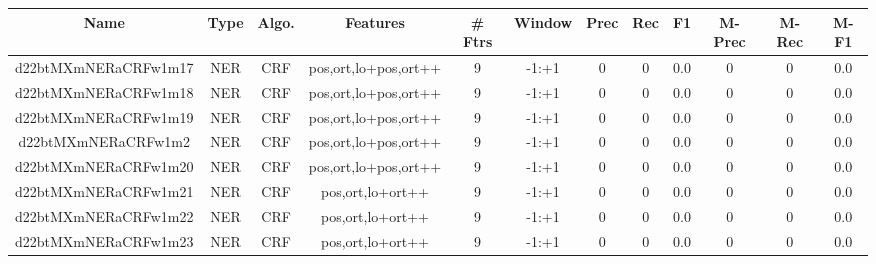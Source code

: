 \documentclass[a4paper]{article}
\begin{document}
\begin{landscape}
\begin{center}
\begin{tabular}{ |c|c|c|c|c|c|c|c|c|c|c|c|}
 \hline
\end{tabular}
\end{center}




\begin{center}
\begin{tabular}{ |c|c|c|c|c|c|c|c|c|c|c|c|} 
 \hline
 	Name & Type & Algo. & Features & \# Ftrs & Window & Prec & Rec & F1 & M-Prec & M-Rec & M-F1\\
 \hline

 	

 
 	
 	\small{ d22btMXmNERaCRFw1m17 } & \small{ NER} & \small{  CRF }  & pos,ort,lo+pos,ort++  &  9 &  \small{  -1:+1 }  &  0 & 0 & 0.0  &  0 & 0 & 0.0 \\
 	

 
 	
 	\small{ d22btMXmNERaCRFw1m18 } & \small{ NER} & \small{  CRF }  & pos,ort,lo+pos,ort++  &  9 &  \small{  -1:+1 }  &  0 & 0 & 0.0  &  0 & 0 & 0.0 \\
 	

 
 	
 	\small{ d22btMXmNERaCRFw1m19 } & \small{ NER} & \small{  CRF }  & pos,ort,lo+pos,ort++  &  9 &  \small{  -1:+1 }  &  0 & 0 & 0.0  &  0 & 0 & 0.0 \\
 	

 
 	
 	\small{ d22btMXmNERaCRFw1m2 } & \small{ NER} & \small{  CRF }  & pos,ort,lo+pos,ort++  &  9 &  \small{  -1:+1 }  &  0 & 0 & 0.0  &  0 & 0 & 0.0 \\
 	

 
 	
 	\small{ d22btMXmNERaCRFw1m20 } & \small{ NER} & \small{  CRF }  & pos,ort,lo+pos,ort++  &  9 &  \small{  -1:+1 }  &  0 & 0 & 0.0  &  0 & 0 & 0.0 \\
 	

 
 	
 	\small{ d22btMXmNERaCRFw1m21 } & \small{ NER} & \small{  CRF }  & pos,ort,lo+ort++  &  9 &  \small{  -1:+1 }  &  0 & 0 & 0.0  &  0 & 0 & 0.0 \\
 	

 
 	
 	\small{ d22btMXmNERaCRFw1m22 } & \small{ NER} & \small{  CRF }  & pos,ort,lo+ort++  &  9 &  \small{  -1:+1 }  &  0 & 0 & 0.0  &  0 & 0 & 0.0 \\
 	

 
 	
 	\small{ d22btMXmNERaCRFw1m23 } & \small{ NER} & \small{  CRF }  & pos,ort,lo+ort++  &  9 &  \small{  -1:+1 }  &  0 & 0 & 0.0  &  0 & 0 & 0.0 \\
 	


\end{tabular}
\end{center}
\end{landscape}
\end{document}
